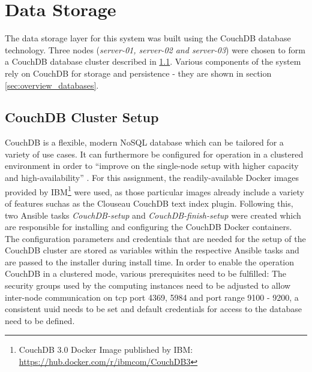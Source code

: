 \documentclass[11pt, oneside]{article}
\begin{document}
\section{Data Storage}
\label{sec:data_storage}
The data storage layer for this system was built using the CouchDB database technology. Three nodes (\emph{server-01, server-02 and server-03}) were chosen to form a CouchDB database cluster described in \ref{sec:CouchDB_database_cluster}. Various components of the system rely on CouchDB for storage and persistence - they are shown in section \ref{sec:overview_databases}. 

\subsection{CouchDB Cluster Setup}
\label{sec:CouchDB_database_cluster}
CouchDB is a flexible, modern NoSQL database which can be tailored for a variety of use cases. It can furthermore be configured for operation in a clustered environment in order to \enquote{improve on the single-node setup with higher capacity and high-availability} \citep{couchdb}. 
\newline
For this assignment, the readily-available Docker images provided by IBM\footnote{CouchDB 3.0 Docker Image published by IBM: \url{https://hub.docker.com/r/ibmcom/CouchDB3}} were used, as those particular images already include a variety of features suchas as the Clouseau CouchDB text index plugin. Following this, two Ansible tasks \textit{CouchDB-setup} and \textit{CouchDB-finish-setup} were created which are responsible for installing and configuring the CouchDB Docker containers.
\newline
The configuration parameters and credentials that are needed for the setup of the CouchDB cluster are stored as variables within the respective Ansible tasks and are passed to the installer during install time.
\newline
In order to enable the operation CouchDB in a clustered mode, various prerequisites need to be fulfilled: The security groups used by the computing instances need to be adjusted to allow inter-node communication on \acrfull{tcp} port 4369, 5984 and port range 9100 - 9200, a consistent \acrfull{uuid} needs to be set and default credentials for access to the database need to be defined.
\end{document}
